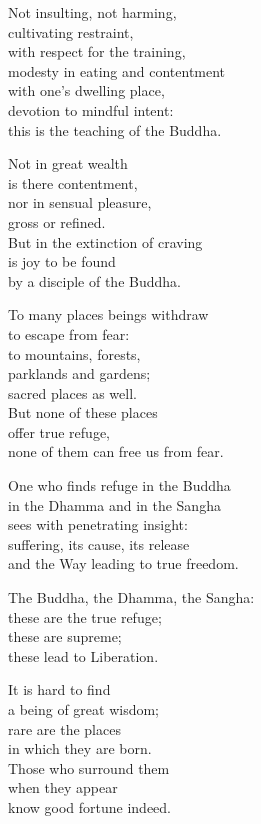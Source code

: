 Not insulting, not harming,\\
cultivating restraint,\\
with respect for the training,\\
modesty in eating and contentment\\
with one's dwelling place,\\
devotion to mindful intent:\\
this is the teaching of the Buddha.


Not in great wealth\\
is there contentment,\\
nor in sensual pleasure,\\
gross or refined.\\
But in the extinction of craving\\
is joy to be found\\
by a disciple of the Buddha.


To many places beings withdraw\\
to escape from fear:\\
to mountains, forests,\\
parklands and gardens;\\
sacred places as well.\\
But none of these places\\
offer true refuge,\\
none of them can free us from fear.


One who finds refuge in the Buddha\\
in the Dhamma and in the Sangha\\
sees with penetrating insight:\\
suffering, its cause, its release\\
and the Way leading to true freedom.


The Buddha, the Dhamma, the Sangha:\\
these are the true refuge;\\
these are supreme;\\
these lead to Liberation.


It is hard to find\\
a being of great wisdom;\\
rare are the places\\
in which they are born.\\
Those who surround them\\
when they appear\\
know good fortune indeed.


